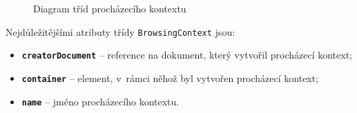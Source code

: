 \begin{figure}[H]
  \begin{center}
    \caption{Diagram tříd procházecího kontextu}
    \label{Figure.BrowsingContext}
  \end{center}
\end{figure}

\noindent Nejdůležitějšími atributy třídy \texttt{BrowsingContext} jsou:

\begin{itemize}
  \item \textbf{\texttt{creatorDocument}} -- reference na dokument, který vytvořil procházecí kontext;
  \item \textbf{\texttt{container}} -- element, v~rámci něhož byl vytvořen procházecí kontext;
  \item \textbf{\texttt{name}} -- jméno procházecího kontextu.
\end{itemize}

